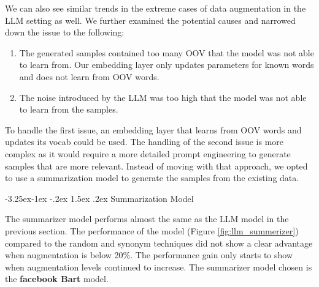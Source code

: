 \documentclass[10pt]{extarticle}
\makeatletter
\renewcommand\paragraph{\@startsection{paragraph}{4}{\z@}%
                                     {-3.25ex\@plus -1ex \@minus -.2ex}%
                                     {1.5ex \@plus .2ex}%
                                     {\normalfont\normalsize\bfseries}}
\makeatother
\begin{document}
We can also see similar trends in the extreme cases of data augmentation in the
LLM setting as well. We further examined the potential causes and narrowed down
the issue to the following:

\begin{enumerate}
  \item The generated samples contained too many OOV that the model was not able to
        learn from. Our embedding layer only updates parameters for known words and
        does not learn from OOV words.
  \item The noise introduced by the LLM was too high that the model was not able to
        learn from the samples.
\end{enumerate}

To handle the first issue, an embedding layer that learns from OOV words and
updates its vocab could be used. The handling of the second issue is more
complex as it would require a more detailed prompt engineering to generate
samples that are more relevant. Instead of moving with that approach, we opted
to use a summarization model to generate the samples from the existing data.

\paragraph{Summarization Model}

The summarizer model performs almost the same as the LLM model in the previous
section. The performance of the model (Figure \ref{fig:llm_summerizer})
compared to the random and synonym techniques did not show a clear advantage
when augmentation is below 20\%. The performance gain only starts to show when
augmentation levels continued to increase. The summarizer model chosen is the
\textbf{facebook Bart} model.
\end{document}

